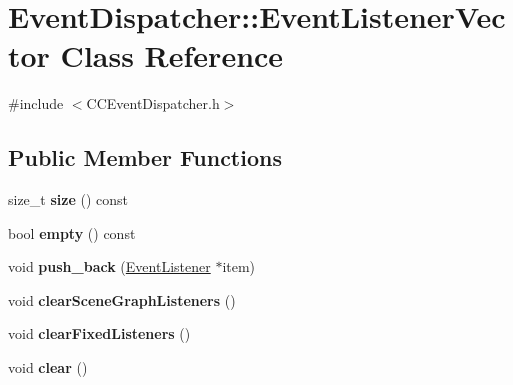 \hypertarget{classEventDispatcher_1_1EventListenerVector}{}\section{Event\+Dispatcher\+:\+:Event\+Listener\+Vector Class Reference}
\label{classEventDispatcher_1_1EventListenerVector}


{\ttfamily \#include $<$C\+C\+Event\+Dispatcher.\+h$>$}

\subsection*{Public Member Functions}
\begin{DoxyCompactItemize}
\item 
\mbox{\label{classEventDispatcher_1_1EventListenerVector_af3b9a511d39a9b31873cbd48934b0f08}} 
size\+\_\+t {\bfseries size} () const
\item 
\mbox{\label{classEventDispatcher_1_1EventListenerVector_a2b3db7d00edfe4a107901eb70e0015e4}} 
bool {\bfseries empty} () const
\item 
\mbox{\label{classEventDispatcher_1_1EventListenerVector_a959b26be9ea1901b46205926603fc9c0}} 
void {\bfseries push\+\_\+back} (\hyperlink{classEventListener}{Event\+Listener} $\ast$item)
\item 
\mbox{\label{classEventDispatcher_1_1EventListenerVector_a0e8410e818d5305bfc38c63d92bd381c}} 
void {\bfseries clear\+Scene\+Graph\+Listeners} ()
\item 
\mbox{\label{classEventDispatcher_1_1EventListenerVector_a524f42ae89fa294a3a142ac95ac463c2}} 
void {\bfseries clear\+Fixed\+Listeners} ()
\item 
\mbox{\label{classEventDispatcher_1_1EventListenerVector_a4d6548e2ec3d542fac5de6bbc508f683}} 
void {\bfseries clear} ()
\item 
\mbox{\label{classEventDispatcher_1_1EventListenerVector_aad9bba722383f5441e7ba9ec59582625}} 

\end{DoxyCompactItemize}
